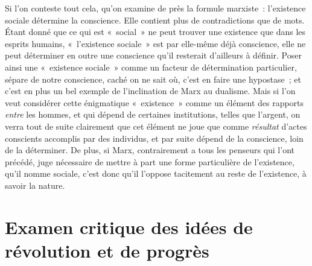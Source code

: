 \documentclass[french,twoside]{book} %
\begin{document}
Si l'on conteste tout cela, qu'on examine de près la formule marxiste : l'existence sociale détermine la conscience. Elle contient plus de contradictions que de mots. Étant donné que ce qui est « social » ne peut trouver une existence que dans les esprits humains, « l'existence sociale » est par elle-même déjà conscience, elle ne peut déterminer en outre une conscience qu'il resterait d'ailleurs à définir. Poser ainsi une « existence sociale » comme un facteur de détermination particulier, sépare de notre conscience, caché on ne sait où, c'est en faire une hypostase ; et c'est en plus un bel exemple de l'inclination de Marx au dualisme. Mais si l'on veut considérer cette énigmatique « existence » comme un élément des rapports {\itshape entre} les hommes, et qui dépend de certaines institutions, telles que l'argent, on verra tout de suite clairement que cet élément ne joue que comme {\itshape résultat} d'actes conscients accomplis par des individus, et par suite dépend de la conscience, loin de la déterminer. De plus, si Marx, contrairement a tous les penseurs qui l'ont précédé, juge nécessaire de mettre à part une forme particulière de l'existence, qu'il nomme sociale, c'est donc qu'il l'oppose tacitement au reste de l'existence, à savoir la nature.\par

\begin{center}
\end{center}
\section[Examen critique des idées de révolution et de progrès ]{Examen critique des idées de révolution et de progrès \protect\footnotemark }\renewcommand{\leftmark}{Examen critique des idées de révolution et de progrès }
\end{document}
